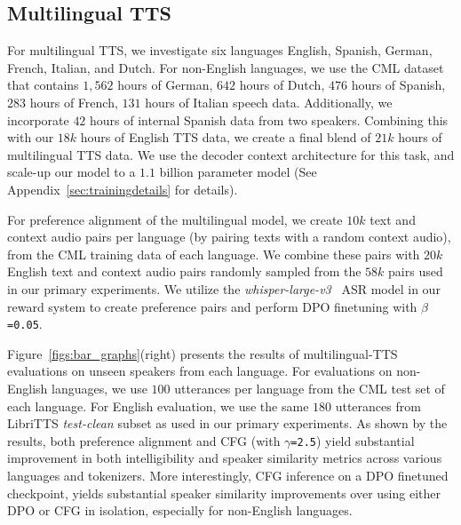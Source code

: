 \subsection{Multilingual TTS}
\label{sec:multilingualexperiment}
For multilingual TTS, we investigate six languages English, Spanish, German, French, Italian, and Dutch.
For non-English languages, we use the CML dataset~\cite{oliveira2023cml} that contains $1{,}562$ hours of German, $642$ hours of Dutch, $476$ hours of Spanish, $283$ hours of French, $131$ hours of Italian speech data. Additionally, we incorporate $42$ hours of internal Spanish data from two speakers. Combining this with our $18k$ hours of English TTS data, we create a final blend of $21k$ hours of multilingual TTS data. We use the decoder context architecture for this task, and scale-up our model to a $1.1$ billion parameter model (See Appendix~\ref{sec:trainingdetails} for details).

For preference alignment of the multilingual model, we create $10k$ text and context audio pairs per language (by pairing texts with a random context audio), from the CML training data of each language. We combine these pairs with $20k$ English text and context audio pairs randomly sampled from the $58k$ pairs used in our primary experiments. We utilize the \textit{whisper-large-v3}~\cite{radford2022whisper} ASR model in our reward system to create preference pairs and perform DPO finetuning with $\beta$\texttt{=0.05}.

Figure~\ref{figs:bar_graphs}(right) presents the results of multilingual-TTS evaluations on unseen speakers from each language. For evaluations on non-English languages, we use $100$
utterances per language from the CML test set of each language. For English evaluation, we use the same $180$ utterances from LibriTTS \textit{test-clean} subset as used in our primary experiments. 
As shown by the results, both preference alignment and CFG (with $\gamma$\texttt{=2.5}) yield substantial improvement in both intelligibility and speaker similarity metrics across various languages and tokenizers.
More interestingly, CFG inference on a DPO finetuned checkpoint, yields substantial speaker similarity improvements over using either DPO or CFG in isolation, especially for non-English languages.

